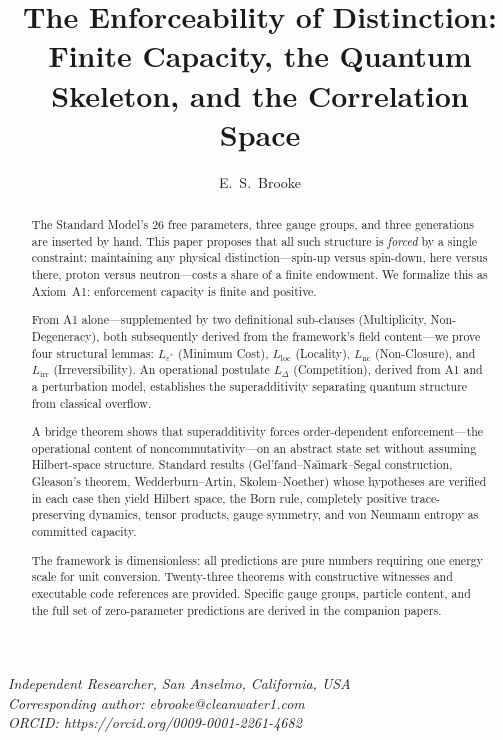 \documentclass[11pt]{article}
\title{The Enforceability of Distinction: Finite Capacity, the Quantum Skeleton, and the Correlation Space}
\author{E.\ S.\ Brooke}
\date{}
\begin{document}
\maketitle

\noindent\textit{Independent Researcher, San Anselmo, California, USA}\\
\textit{Corresponding author: ebrooke@cleanwater1.com}\\
\textit{ORCID: https://orcid.org/0009-0001-2261-4682}

\bigskip

\begin{abstract}
\noindent
The Standard Model's 26 free parameters, three gauge groups, and three generations are inserted by hand.  This paper proposes that all such structure is \emph{forced} by a single constraint: maintaining any physical distinction---spin-up versus spin-down, here versus there, proton versus neutron---costs a share of a finite endowment.  We formalize this as Axiom~A1: enforcement capacity is finite and positive.

From A1 alone---supplemented by two definitional sub-clauses (Multiplicity, Non-Degeneracy), both subsequently derived from the framework's field content---we prove four structural lemmas: $L_{\varepsilon^*}$ (Minimum Cost), $L_{\mathrm{loc}}$ (Locality), $L_{\mathrm{nc}}$ (Non-Closure), and $L_{\mathrm{irr}}$ (Irreversibility).  An operational postulate $L_\Delta$ (Competition), derived from A1 and a perturbation model, establishes the superadditivity separating quantum structure from classical overflow.

A bridge theorem shows that superadditivity forces order-dependent enforcement---the operational content of noncommutativity---on an abstract state set without assuming Hilbert-space structure.  Standard results (Gel'fand--Na\u{\i}mark--Segal construction, Gleason's theorem, Wedderburn--Artin, Skolem--Noether) whose hypotheses are verified in each case then yield Hilbert space, the Born rule, completely positive trace-preserving dynamics, tensor products, gauge symmetry, and von Neumann entropy as committed capacity.

The framework is dimensionless: all predictions are pure numbers requiring one energy scale for unit conversion.  Twenty-three theorems with constructive witnesses and executable code references are provided.  Specific gauge groups, particle content, and the full set of zero-parameter predictions are derived in the companion papers.
\end{abstract}
\end{document}
